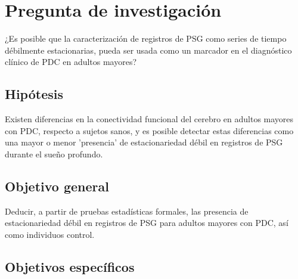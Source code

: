 
\section{Pregunta de investigaci\'on}

¿Es posible que la caracterizaci\'on de registros de PSG como series de tiempo d\'ebilmente 
estacionarias, pueda ser usada como un marcador en el diagn\'ostico cl\'inico de PDC en adultos 
mayores?


\subsection{Hip\'otesis}

Existen diferencias en la conectividad funcional del cerebro en adultos mayores con PDC, respecto
a sujetos sanos, y es posible detectar estas diferencias como una mayor o menor 'presencia' de 
estacionariedad d\'ebil en registros de PSG durante el sue\~no profundo.


\subsection{Objetivo general}

Deducir, a partir de pruebas estad\'isticas formales, las presencia de estacionariedad d\'ebil en
registros de PSG para adultos mayores con PDC, as\'i como individuos control.


\subsection{Objetivos espec\'ificos}

